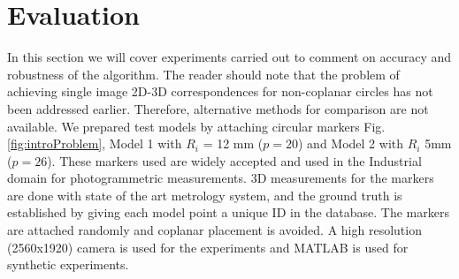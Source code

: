 \documentclass{bmvc2k}
\begin{document}

\section{Evaluation}
In this section we will cover experiments carried out to comment on accuracy and robustness of the algorithm. 
The reader should note that the problem of achieving single image 2D-3D correspondences for non-coplanar circles has not been addressed earlier. 
Therefore, alternative methods for comparison are not available. 
We prepared test models by attaching circular markers Fig. \ref{fig:introProblem}, Model 1 with $ R_i $ = 12 mm ($ p = 20 $) and Model 2 with $ R_i $ 5mm ($ p = 26$). These markers used are widely accepted and used in the Industrial domain for photogrammetric measurements.     
3D measurements for the markers are done with state of the art metrology system, and the ground truth is established by giving each model point a unique ID in the database. 
The markers are attached randomly and coplanar placement is avoided. 
A high resolution (2560x1920) camera is used for the experiments and MATLAB is used for synthetic experiments. 
\end{document}
